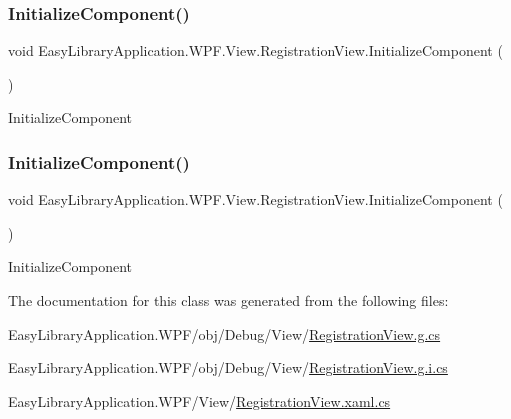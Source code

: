 \subsubsection{\texorpdfstring{Initialize\+Component()}{InitializeComponent()}\hspace{0.1cm}{\footnotesize\ttfamily [1/2]}}
{\footnotesize\ttfamily void Easy\+Library\+Application.\+W\+P\+F.\+View.\+Registration\+View.\+Initialize\+Component (\begin{DoxyParamCaption}{ }\end{DoxyParamCaption})}



Initialize\+Component 

\mbox{\label{class_easy_library_application_1_1_w_p_f_1_1_view_1_1_registration_view_aa25bafc8023f60dcefa7527fbda43b3e}} 
\subsubsection{\texorpdfstring{Initialize\+Component()}{InitializeComponent()}\hspace{0.1cm}{\footnotesize\ttfamily [2/2]}}
{\footnotesize\ttfamily void Easy\+Library\+Application.\+W\+P\+F.\+View.\+Registration\+View.\+Initialize\+Component (\begin{DoxyParamCaption}{ }\end{DoxyParamCaption})}



Initialize\+Component 



The documentation for this class was generated from the following files\+:\begin{DoxyCompactItemize}
\item 
Easy\+Library\+Application.\+W\+P\+F/obj/\+Debug/\+View/\mbox{\hyperlink{_registration_view_8g_8cs}{Registration\+View.\+g.\+cs}}\item 
Easy\+Library\+Application.\+W\+P\+F/obj/\+Debug/\+View/\mbox{\hyperlink{_registration_view_8g_8i_8cs}{Registration\+View.\+g.\+i.\+cs}}\item 
Easy\+Library\+Application.\+W\+P\+F/\+View/\mbox{\hyperlink{_registration_view_8xaml_8cs}{Registration\+View.\+xaml.\+cs}}\end{DoxyCompactItemize}
